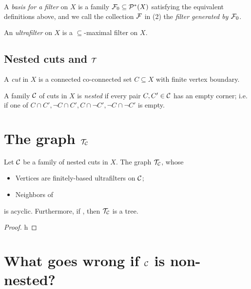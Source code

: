 \documentclass{amsart}
\begin{document}
    \begin{definition}
        A \textit{basis for a filter} on $X$ is a family $\mathcal{F}_0\subseteq\mathcal{P}^\ast(X)$ satisfying the equivalent definitions above, and we call the collection $\mathcal{F}$ in (2) the \textit{filter generated by $\mathcal{F}_0$}.
    \end{definition}

    \begin{definition}
        An \textit{ultrafilter} on $X$ is a $\subseteq$-maximal filter on $X$.
    \end{definition}

    \subsection{Nested cuts and $\mathcal{T}$}

    \begin{definition}
        A \textit{cut} in $X$ is a connected co-connected set $C\subseteq X$ with finite vertex boundary.
    \end{definition}
    \begin{definition}
        A family $\mathcal{C}$ of cuts in $X$ is \textit{nested} if every pair $C,C'\in\mathcal{C}$ has an empty corner; i.e. if one of $C\cap C',\lnot C\cap C',C\cap\lnot C',\lnot C\cap\lnot C'$ is empty.
    \end{definition}

    \section{The graph $\mathcal{T}_{\mathcal{C}}$}

    \begin{theorem}
        Let $\mathcal{C}$ be a family of nested cuts in $X$. The graph $\mathcal{T}_{\mathcal{C}}$, whose
        \begin{itemize}
            \item Vertices are finitely-based ultrafilters on $\mathcal{C}$;
            \item Neighbors of
        \end{itemize}
        is acyclic. Furthermore, if {\color{red}{something}}, then $\mathcal{T}_{\mathcal{C}}$ is a tree.
    \end{theorem}
    \begin{proof}
        h
    \end{proof}

    \section{What goes wrong if $\mathcal{C}$ is non-nested?}
\end{document}
